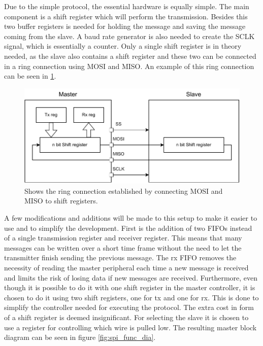 \documentclass[./dissertation.tex]{subfiles}
\begin{document}
Due to the simple protocol, the essential hardware is equally simple. The main component is a shift register which will perform the transmission. Besides this two buffer registers is needed for holding the message and saving the message coming from the slave. A baud rate generator is also needed to create the SCLK signal, which is essentially a counter. Only a single shift register is in theory needed, as the slave also contains a shift register and these two can be connected in a ring connection using MOSI and MISO. An example of this ring connection can be seen in \ref{fig:spi_min_comp}.

\begin{figure}[H]
    \centering
    \includegraphics[width=\linewidth]{subfiles/imgs/IP_Blocks_Pics/spi_min_comp.drawio.pdf}
    \caption{Shows the ring connection established by connecting MOSI and MISO to shift registers.}
    \label{fig:spi_min_comp}
\end{figure}

A few modifications and additions will be made to this setup to make it easier to use and to simplify the development. First is the addition of two FIFOs instead of a single transmission register and receiver register. This means that many messages can be written over a short time frame without the need to let the transmitter finish sending the previous message. The rx FIFO removes the necessity of reading the master peripheral each time a new message is received and limits the risk of losing data if new messages are received. Furthermore, even though it is possible to do it with one shift register in the master controller, it is chosen to do it using two shift registers, one for tx and one for rx. This is done to simplify the controller needed for executing the protocol. The extra cost in form of a shift register is deemed insignificant. For selecting the slave it is chosen to use a register for controlling which wire is pulled low. The resulting master block diagram can be seen in figure \ref{fig:spi_func_dia}. 
\end{document}
